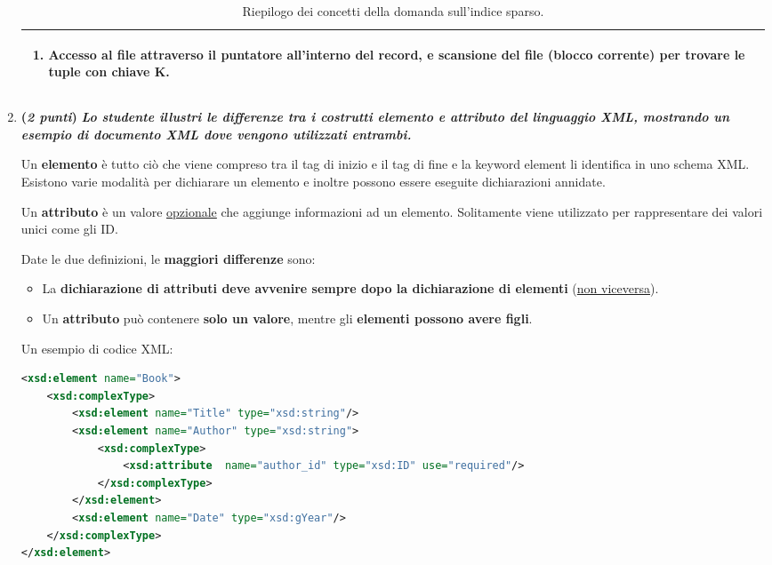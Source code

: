 \documentclass[a4paper]{article}
\begin{document}
\begin{enumerate}
\begin{table}[!htp]
\begin{tabular}{@{} l p{24em} @{}}
\begin{enumerate}
					\item \textbf{Accesso al file attraverso il puntatore all'interno del record}, e \textbf{scansione del file} (blocco corrente) \textbf{per trovare le tuple con chiave} K.
				\end{enumerate} \\
				\bottomrule
			\end{tabular}
			\caption{Riepilogo dei concetti della domanda sull'indice sparso.}
		\end{table}\newpage
		
		\item \textbf{(\emph{2 punti})} \textcolor{Green4}{\textbf{\emph{Lo studente illustri le differenze tra i costrutti \textbf{elemento} e \textbf{attributo} del linguaggio XML, mostrando un esempio di documento XML dove vengono utilizzati entrambi.}}}\label{dom: elemento e attributo in XML}
		
		Un \textbf{elemento} è tutto ciò che viene compreso tra il tag di inizio e il tag di fine e la keyword \textsf{element} li identifica in uno schema XML. Esistono varie modalità per dichiarare un elemento e inoltre possono essere eseguite dichiarazioni annidate.
		
		Un \textbf{attributo} è un valore \underline{opzionale} che aggiunge informazioni ad un elemento. Solitamente viene utilizzato per rappresentare dei valori unici come gli ID.
		
		Date le due definizioni, le \textbf{maggiori differenze} sono:
		\begin{itemize}
			\item La \textbf{dichiarazione di attributi deve avvenire sempre dopo la dichiarazione di elementi} (\underline{non viceversa}).
			
			\item Un \textbf{attributo} può contenere \textbf{solo un valore}, mentre gli \textbf{elementi possono avere figli}.
		\end{itemize}
		Un esempio di codice XML:
		\begin{lstlisting}[language=XML]
<xsd:element name="Book">
	<xsd:complexType>
		<xsd:element name="Title" type="xsd:string"/>
		<xsd:element name="Author" type="xsd:string">
			<xsd:complexType>
				<xsd:attribute 	name="author_id" type="xsd:ID" use="required"/>
			</xsd:complexType>
		</xsd:element>
		<xsd:element name="Date" type="xsd:gYear"/>
	</xsd:complexType>
</xsd:element>\end{lstlisting}
	\end{enumerate}
	
\end{document}
